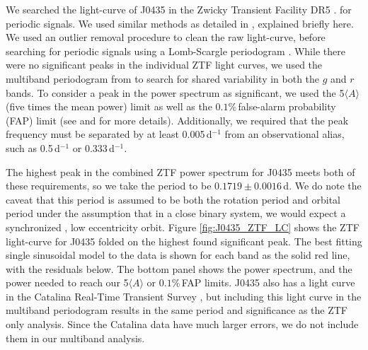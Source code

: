 \documentclass[twocolumn, tighten, times, astrosymb]{aastex631}
\begin{document}
\begin{figure*}
\centering
{}
\caption{Zwicky Transient Facility light-curves for J0435. The top panels show the light-curves in both the $g$ and $r$ bands, folded on the best found significant period of $0.1719\pm0.0016$\,d. The red line shows the best fitting model to the each phased light-curve, with residuals shown below the light-curve. The red square markers are the binned data in 10 phase bins. The multiband LS power spectrum is shown in the bottom panel, Our 5$\langle A\rangle$ or $0.1\%$\,FAP limits are marked by the dashed and dotted red horizontal lines respectively.}
\label{fig:J0435_ZTF_LC}
\end{figure*}

We searched the light-curve of J0435 in the Zwicky Transient Facility DR5 \citep[ZTF;][]{ZTF_1,ZTF_2,ZTF_3}. for periodic signals. We used similar methods as detailed in \citet{Roulston2021a}, explained briefly here. We used an outlier removal procedure to clean the raw light-curve, before searching for periodic signals using a Lomb-Scargle periodogram \citep[LS;][]{Lomb1976, Scargle1982}. While there were no significant peaks in the individual ZTF light curves, we used the multiband periodogram from \citet{astropyLS2} to search for shared variability in both the $g$ and $r$ bands. To consider a peak in the power spectrum as significant, we used the 5$\langle A\rangle$ (five times the mean power) limit as well as the $0.1\%$\,false-alarm probability (FAP) limit (see \citealt{Greiss2014} and \citealt{Hermes2015} for more details). Additionally, we required that the peak frequency must be separated by at least 0.005\,d$^{-1}$ from an observational alias, such as 0.5\,d$^{-1}$ or 0.333\,d$^{-1}$. 

The highest peak in the combined ZTF power spectrum for J0435 meets both of these requirements, so we take the period to be $0.1719\pm0.0016$\,d. We do note the caveat that this period is assumed to be both the rotation period and orbital period under the assumption that in a close binary system, we would expect a synchronized \citep{Hurley2002}, low eccentricity orbit. Figure \ref{fig:J0435_ZTF_LC} shows the ZTF light-curve for J0435 folded on the highest found significant peak. The best fitting single sinusoidal model to the data is shown for each band as the solid red line, with the residuals below. The bottom panel shows the power spectrum, and the power needed to reach our  5$\langle A\rangle$ or $0.1\%$\,FAP limits. J0435 also has a light curve in the Catalina Real-Time Transient Survey \citep{CRTS1}, but including this light curve in the multiband periodogram results in the same period and significance as the ZTF only analysis. Since the Catalina data have much larger errors, we do not include them in our multiband analysis. 
\end{document}
